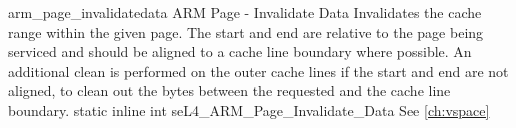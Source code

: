%
%
%
%

\apidoc
{arm_page_invalidatedata}
{ARM Page - Invalidate Data}
{Invalidates the cache range within the given page. The start and end are relative to the page being serviced 
and should be aligned to a cache line boundary where possible. 
An additional clean is performed on the outer cache lines if the start and end are 
not aligned, to clean out the bytes between the requested and the cache line boundary.}
{static inline int seL4\_ARM\_Page\_Invalidate\_Data}
{
}
{\errorenumdesc}
{See \autoref{ch:vspace}}

